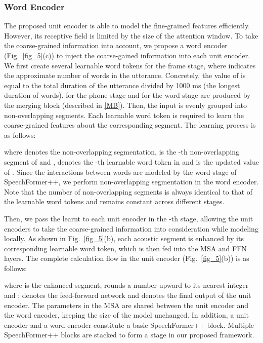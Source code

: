 \documentclass[lettersize,journal]{IEEEtran}
\begin{document}
\subsubsection{Word Encoder}
The proposed unit encoder is able to model the fine-grained features efficiently. However, its receptive field is limited by the size of the attention window. To take the coarse-grained information into account, we  propose a word encoder (Fig.~\ref{fig_5}(c)) to inject the coarse-gained information into each unit encoder. We first create several learnable word tokens  for the frame stage, where  indicates the approximate number of words in the utterance. Concretely, the value of  is equal to the total duration of the utterance divided by 1000 ms (the longest duration of words).  for the phone stage and  for the word stage are produced by the merging block (described in \ref{MB}). Then, the input  is evenly grouped into  non-overlapping segments. Each learnable word token is required to learn the coarse-grained features about the corresponding segment. The learning process is  as follows:


where  denotes the non-overlapping segmentation,  is the -th non-overlapping segment of  and ,  denotes the -th learnable word token in  and  is the updated value of . Since the interactions between words are modeled by the word stage of SpeechFormer++, we perform non-overlapping segmentation in the word encoder. Note that the number of non-overlapping segments is always identical to that of the learnable word tokens and remains constant across different stages.

Then, we pass the learnt  to each unit encoder in the -th stage, allowing the unit encoders to take the coarse-grained information into consideration while modeling locally. As shown in Fig.~\ref{fig_5}(b), each acoustic segment is enhanced by its corresponding learnable word token, which is then fed into the MSA and FFN layers. The complete calculation flow in the unit encoder (Fig.~\ref{fig_5}(b)) is  as follows:



where  is the enhanced segment,  rounds a number upward to its nearest integer and ;  denotes the feed-forward network and  denotes the final output of the unit encoder. 
The parameters in the MSA are shared between the unit encoder and the word encoder, keeping the size of the model unchanged.
In addition, a unit encoder and a word encoder constitute a basic SpeechFormer++ block. Multiple SpeechFormer++ blocks are stacked to form a stage in our proposed framework.
\end{document}
